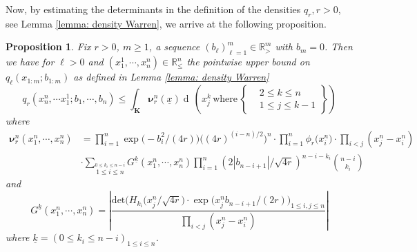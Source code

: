 \documentclass[11pt, reqno]{amsart}
\numberwithin{equation}{section}
\newcounter{dummy} \numberwithin{dummy}{section}
\newtheorem{proposition}[dummy]{Proposition}
\newcommand{\R}{\ensuremath{\mathbb{R}}}
\newcommand{\diff}{\ensuremath{\operatorname{d}\!}}
\begin{document}
Now, by estimating the determinants in the definition of the densities $q_r, r>0$, see Lemma \ref{lemma: density Warren}, we arrive at the following proposition.
\begin{proposition}\label{prop: lb density 2}
     Fix $r>0$, $m\ge 1$, a sequence $(b_\ell)_{\ell =1}^m \in\R^m_{>}$ with $b_m = 0$. Then we have for $\ell > 0$ and $(x^1_1, \cdots, x^n_n)\in \R^n_{\le}$ the pointwise upper bound on $q_\ell(x_{1:m}; b_{1:m})$ as defined in Lemma \ref{lemma: density Warren}
\begin{equation*}
        q_r(x^n_n, \cdots x^1_1; b_1, \cdots, b_n)\le \displaystyle\int_{\boldsymbol{K}} \boldsymbol{\nu}^n_{r}(\underline{x})\diff\, \left(x^k_j\, \mathrm{where}\, \left.\begin{cases}
       &2\le k \le n\\
       &1\le j \le k-1
   \end{cases}\right\} \right)
\end{equation*}
where 
\begin{equation*}
\begin{array}{cc}
     \boldsymbol{\nu}^n_r(x_1^n, \cdots, x^n_n) & = \displaystyle\prod^n_{i=1}\exp\big(-b_i^2/(4r)\big) \big((4r)^{(i-n)/2}\big)^n \cdot\displaystyle\prod_{i=1}^n \phi_r\big(x^n_i\big) \cdot\displaystyle\prod_{i<j} (x^n_j-x^n_i)  \\
     &  \cdot \displaystyle\sum_{\stackrel{0\le k_i\le n-i}{1\le i \le n}}G^{\underline{k}}(x^n_1,\cdots, x^n_n)\displaystyle\prod^n_{i=1}\left(2|b_{n-i+1}|/\sqrt{4r}\right)^{n-i-k_i}{\binom{n-i}{k_i}}
\end{array}
\end{equation*}
and 
\begin{equation*}
   G^{\underline{k}}(x^n_1,\cdots, x^n_n) = \left\vert\frac{\mathrm{det}\big(H_{k_i}\big(x^n_j/\sqrt{4r}\big)\cdot \exp\big(x^n_j b_{n-i+1}/(2r)\big)_{1\le i, j\le n}}{\displaystyle\prod_{i<j} (x^n_j-x^n_i) }\right\vert
\end{equation*}
where $\underline{k} = (0\le k_i\le n-i)_{1\le i \le n}$.
\end{proposition}
\end{document}
